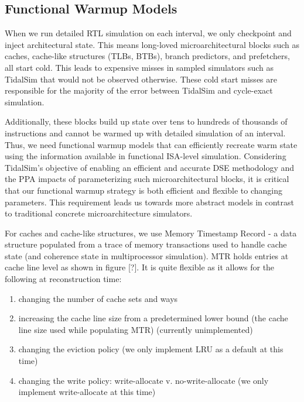 \documentclass[sigplan,nonacm,10pt]{acmart}
\begin{document}
\subsection{Functional Warmup Models}




When we run detailed RTL simulation on each interval, we only checkpoint and inject architectural state. This means long-loved microarchitectural blocks such as caches, cache-like structures (TLBs, BTBs), branch predictors, and prefetchers, all start cold. 
This leads to expensive misses in sampled simulators such as TidalSim that would not be observed otherwise. These cold start misses are responsible for the majority of the error between TidalSim and cycle-exact simulation.

Additionally, these blocks build up state over tens to hundreds of thousands of instructions and cannot be warmed up with detailed simulation of an interval. Thus, we need functional warmup models that can efficiently recreate warm state using the information available in functional ISA-level simulation.
Considering TidalSim's objective of enabling an efficient and accurate DSE methodology and the PPA impacts of parameterizing such microarchitectural blocks, it is critical that our functional warmup strategy is both efficient and flexible to changing parameters. This requirement leads us towards more abstract models in contrast to traditional concrete microarchitecture simulators.

For caches and cache-like structures, we use Memory Timestamp Record \cite{barr2005accelerating} - a data structure populated from a trace of memory transactions used to handle cache state (and coherence state in multiprocessor simulation). MTR holds entries at cache line level as shown in figure [?]. 
It is quite flexible as it allows for the following at reconstruction time:
\begin{enumerate}
  \item changing the number of cache sets and ways 
  \item increasing the cache line size from a predetermined lower bound (the cache line size used while populating MTR) (currently unimplemented)
  \item changing the eviction policy (we only implement LRU as a default at this time)
  \item changing the write policy: write-allocate v. no-write-allocate (we only implement write-allocate at this time)
\end{enumerate}
\end{document}
